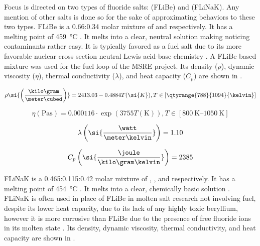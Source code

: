 Focus is directed on two types of fluoride salts:  (FLiBe) and
(FLiNaK). Any mention of other salts is done so for the sake of approximating
behaviors to these two types.
FLiBe is a 0.66:0.34 molar mixture of  and  respectively. It
has a melting point of \SI{459}{\celsius} \cite{rev16,rev17}.
It melts into a clear, neutral
solution making noticing contaminants rather easy. It is typically
favored as a fuel salt due to its more favorable nuclear cross section neutral
Lewis acid-base chemistry \cite{rev18}. A FLiBe based mixture was used for the
fuel loop of the MSRE project\cite{rev19, rev20, rev21, rev22}. Its density
($\rho$), dynamic viscosity ($\eta$), thermal conductivity ($\lambda$), and
heat capacity ($C_p$) are shown in
. \cite{rev17} \par

\begin{equation}
  \rho\si{\left(\frac{\kilo\gram}{\meter\cubed}\right)} = 2413.03 - 0.4884
  T(\si{K}), T \in [\qtyrange{788}{1094}{\kelvin}] \label{eq: flibe density}
\end{equation}

\begin{equation}
  \eta(\si{\pascal\second}) = 0.000116 \cdot \exp(3755 T(\si{\kelvin})), T
  \in [\qtyrange{800}{1050}{\kelvin}]
  \label{eq: flibe viscosity}
\end{equation}

\begin{equation}
  \lambda\left(\si{\frac{\watt}{\meter\kelvin}}\right) = 1.10
  \label{eq: flibe conducivity}
\end{equation}

\begin{equation}
  C_p\left(\si{\frac{\joule}{\kilo\gram\kelvin}}\right) = 2385
  \label{eq: flibe heat capacity} \\
\end{equation}

FLiNaK is a 0.465:0.115:0.42 molar mixture of , , and 
respectively. It has a melting point of \SI{454}{\celsius}
\cite{rev17}. It melts into a clear, chemically basic solution
\cite{rev18}. FLiNaK is often used in place of FLiBe in molten salt research
not involving fuel, despite its lower heat capacity, due to its lack of any
highly toxic beryllium, however it is more corrosive than FLiBe due to the
presence of free fluoride ions in its molten state \cite{rev18}.
Its density, dynamic viscosity, thermal conductivity, and heat capacity are
shown in  \cite{rev17}. \par

